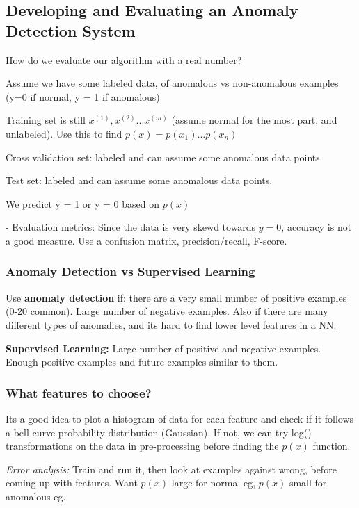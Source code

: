 \documentclass{article}
\begin{document}
\subsection{Developing and Evaluating an Anomaly Detection System}

How do we evaluate our algorithm with a real number?



Assume we have some labeled data, of anomalous vs non-anomalous examples (y=0 if normal, y = 1 if anomalous)

Training set is still $x^{(1)}, x^{(2)} ... x^{(m)}$ (assume normal for the most part, and unlabeled). Use this to find $p(x) = p(x_1) ... p(x_n)$

Cross validation set: labeled and can assume some anomalous data points

Test set: labeled and can assume some anomalous data points.

We predict y = 1 or y = 0 based on $p(x)$


- Evaluation metrics: Since the data is very skewd towards $y = 0$, accuracy is not a good measure. Use a confusion matrix, precision/recall, F-score.


\subsubsection{Anomaly Detection vs Supervised Learning}


Use \textbf{anomaly detection} if: there are a very small number of positive examples (0-20 common). Large number of negative examples. Also if there are many different types of anomalies, and its hard to find lower level features in a NN.

\textbf{Supervised Learning: } Large number of positive and negative examples. Enough positive examples and future examples similar to them.


\subsubsection{What features to choose?}

Its a good idea to plot a histogram of data for each feature and check if it follows a bell curve probability distribution (Gaussian). If not, we can try log() transformations on the data in pre-processing before finding the $p(x)$ function.

\textit{Error analysis:} Train and run it, then look at examples against wrong, before coming up with features. Want $p(x)$ large for normal eg, $p(x)$ small for anomalous eg. 
\end{document}
